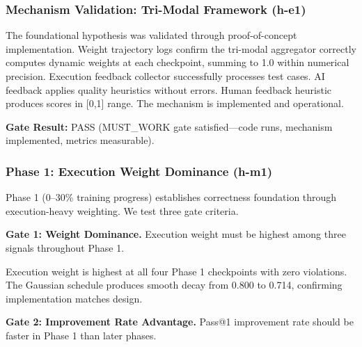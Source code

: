 
\subsubsection{Mechanism Validation: Tri-Modal Framework (h-e1)}

The foundational hypothesis was validated through proof-of-concept implementation. Weight trajectory logs confirm the tri-modal aggregator correctly computes dynamic weights at each checkpoint, summing to 1.0 within numerical precision. Execution feedback collector successfully processes test cases. AI feedback applies quality heuristics without errors. Human feedback heuristic produces scores in [0,1] range. The mechanism is implemented and operational.

\textbf{Gate Result:} PASS (MUST\_WORK gate satisfied---code runs, mechanism implemented, metrics measurable).

\subsubsection{Phase 1: Execution Weight Dominance (h-m1)}

Phase 1 (0--30\% training progress) establishes correctness foundation through execution-heavy weighting. We test three gate criteria.

\textbf{Gate 1: Weight Dominance.} Execution weight must be highest among three signals throughout Phase 1.

\begin{table}[htbp]
\centering
{}
\end{table}

Execution weight is highest at all four Phase 1 checkpoints with zero violations. The Gaussian schedule produces smooth decay from 0.800 to 0.714, confirming implementation matches design.

\textbf{Gate 2: Improvement Rate Advantage.} Pass@1 improvement rate should be faster in Phase 1 than later phases.

